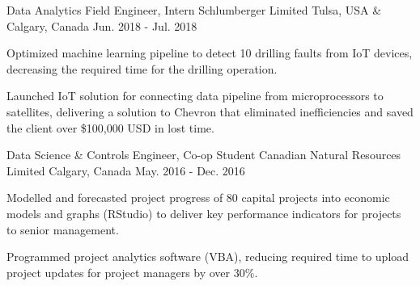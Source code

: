 \begin{cventries}
  \cventry
    {Data Analytics Field Engineer, Intern} %
    {Schlumberger Limited} %
    {Tulsa, USA \& Calgary, Canada} %
    {Jun. 2018 - Jul. 2018} %
    {
      \begin{cvitems} %
        \item {Optimized machine learning pipeline to detect 10 drilling faults from IoT devices, decreasing the required time for the drilling operation.}
        \item {Launched IoT solution for connecting data pipeline from microprocessors to satellites, delivering a solution to Chevron that eliminated inefficiencies and saved the client over \$100,000 USD in lost time.}
      \end{cvitems}
    }

  \cventry
    {Data Science \& Controls Engineer, Co-op Student} %
    {Canadian Natural Resources Limited} %
    {Calgary, Canada} %
    {May. 2016 - Dec. 2016} %
    {
      \begin{cvitems} %
        \item {Modelled and forecasted project progress of 80 capital projects into economic models and graphs (RStudio) to deliver key performance indicators for projects to senior management.}
        \item {Programmed project analytics software (VBA), reducing required time to upload project updates for project managers by over 30\%.}
      \end{cvitems}
    }



\end{cventries}
